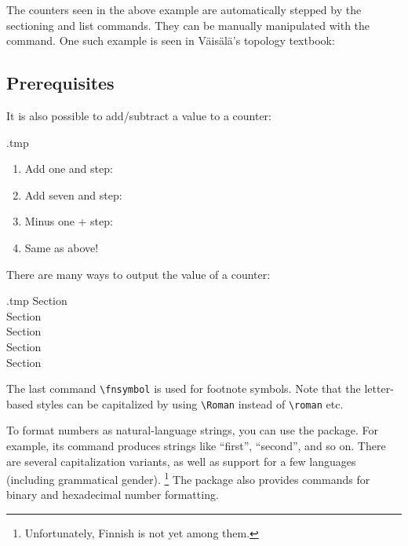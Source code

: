 The counters seen in the above example are automatically stepped by the sectioning and list commands.
They can be manually manipulated with the  command.
One such example is seen in Väisälä's topology textbook:

\begin{ExampleCode}
\setcounter{chapter}{-1}
\chapter{Prerequisites}

\end{ExampleCode}

It is also possible to add/subtract a value to a counter:
%
\begin{VerbatimOut}{\jobname.tmp}
\begin{enumerate}
\item Add one and step:
\item Add seven and step:
  \addtocounter{enumi}{7}
\item Minus one + step:
  \addtocounter{enumi}{-1}
\item Same as above!
\end{enumerate}
\end{VerbatimOut}
\ShowExample

There are many ways to output the value of a counter:\label{par:counter format}
%
\begin{VerbatimOut}{\jobname.tmp}
Section~\\
Section~\\
Section~\\
Section~\\
Section~
\end{VerbatimOut}
\ShowExample
The last command \verb|\fnsymbol| is used for footnote symbols.
Note that the letter-based styles can be capitalized
by using \verb|\Roman| instead of \verb|\roman| etc.

To format numbers as natural-language strings, you can use the  package.
For example, its  command produces strings like ``first'', ``second'', and so on.
There are several capitalization variants,
as well as support for a few languages (including grammatical gender).%
\footnote{Unfortunately, Finnish is not yet among them.}
The package also provides commands for binary and hexadecimal number formatting.

